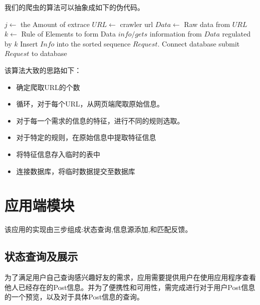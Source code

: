 我们的爬虫的算法可以抽象成如下的伪代码。

\begin{codebox}
\li \For $j \gets $ \To the Amount of extrace \label{li:for}
\li     \Do \label{li:for-begin}
\li 	$URL \gets$ crawler url 
\li 	$Data \gets$ Raw data from $URL$
\li 	\For $k \gets$ Rule of Elements to form Data \label{li:for}
\li     	\Do \label{li:for-begin}
\li 		$info /gets$ information from $Data$ regulated by $k$
\li      	Insert $Info$ into the sorted sequence $Request$.
\label{li:for-end}
                \End
\li         Connect database submit $Request$ to database       \label{li:for-end}
        \End
\end{codebox}

该算法大致的思路如下：
\begin{itemize}
\item 确定爬取URL的个数
\item 循环，对于每个URL，从网页端爬取原始信息。
\item 对于每一个需求的信息的特征，进行不同的规则选取。
\item 对于特定的规则，在原始信息中提取特征信息
\item 将特征信息存入临时的表中
\item 连接数据库，将临时数据提交至数据库
\end{itemize}


\section{应用端模块}
该应用的实现由三步组成:状态查询,信息源添加,和匹配反馈。


\subsection{状态查询及展示}
为了满足用户自己查询感兴趣好友的需求，应用需要提供用户在使⽤应⽤程序查看他人已经存在的Post信息。并为了便携性和可用性，需完成进行对于用户Post信息的一个预览，以及对于具体Post信息的查询。

